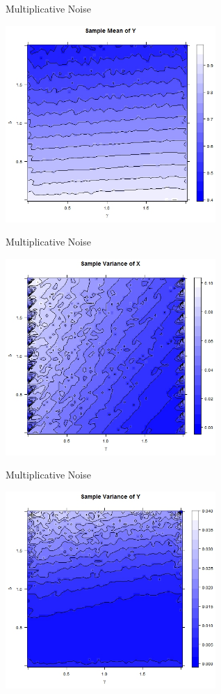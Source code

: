\begin{frame}{Multiplicative Noise}
\begin{center}
	\includegraphics[width=8cm]{img/RplotMultiContourY} 
\end{center}
\end{frame}

\begin{frame}{Multiplicative Noise}
\begin{center}
	\includegraphics[width=8cm]{img/RplotSampleMultiVarX} 
\end{center}
\end{frame}

\begin{frame}{Multiplicative Noise}
\begin{center}
	\includegraphics[width=8cm]{img/RplotMultiSampleVarY} 
\end{center}
\end{frame}

